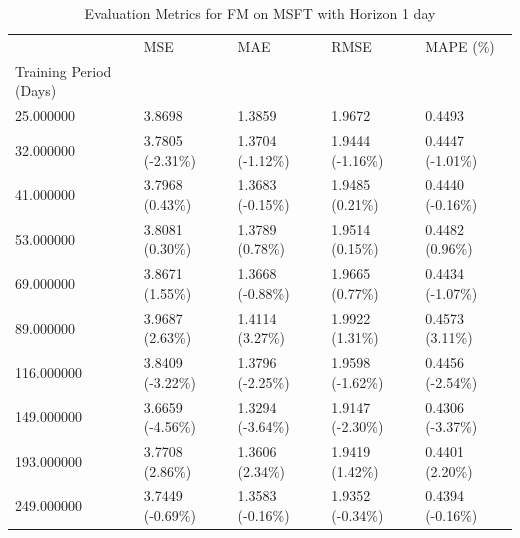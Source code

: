 \begin{table}
\caption{Evaluation Metrics for FM on MSFT with Horizon 1 day}
\label{tab:fm_MSFT_h1_metrics}
\begin{tabular}{lllll}
\toprule
 & MSE & MAE & RMSE & MAPE (\%) \\
Training Period (Days) &  &  &  &  \\
\midrule
25.000000 & 3.8698 & 1.3859 & 1.9672 & 0.4493 \\
32.000000 & 3.7805 (-2.31\%) & 1.3704 (-1.12\%) & 1.9444 (-1.16\%) & 0.4447 (-1.01\%) \\
41.000000 & 3.7968 (0.43\%) & 1.3683 (-0.15\%) & 1.9485 (0.21\%) & 0.4440 (-0.16\%) \\
53.000000 & 3.8081 (0.30\%) & 1.3789 (0.78\%) & 1.9514 (0.15\%) & 0.4482 (0.96\%) \\
69.000000 & 3.8671 (1.55\%) & 1.3668 (-0.88\%) & 1.9665 (0.77\%) & 0.4434 (-1.07\%) \\
89.000000 & 3.9687 (2.63\%) & 1.4114 (3.27\%) & 1.9922 (1.31\%) & 0.4573 (3.11\%) \\
116.000000 & 3.8409 (-3.22\%) & 1.3796 (-2.25\%) & 1.9598 (-1.62\%) & 0.4456 (-2.54\%) \\
149.000000 & 3.6659 (-4.56\%) & 1.3294 (-3.64\%) & 1.9147 (-2.30\%) & 0.4306 (-3.37\%) \\
193.000000 & 3.7708 (2.86\%) & 1.3606 (2.34\%) & 1.9419 (1.42\%) & 0.4401 (2.20\%) \\
249.000000 & 3.7449 (-0.69\%) & 1.3583 (-0.16\%) & 1.9352 (-0.34\%) & 0.4394 (-0.16\%) \\
\bottomrule
\end{tabular}
\end{table}
